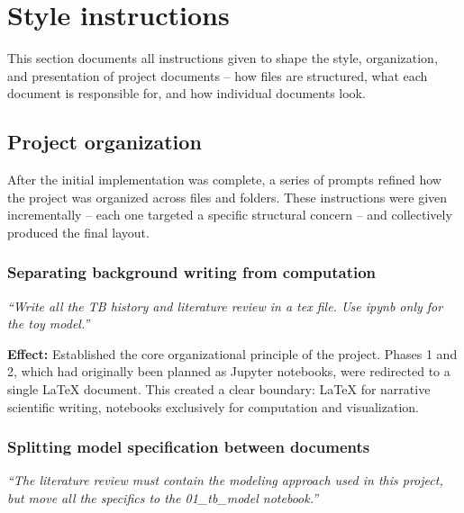 \documentclass[11pt]{article}
\begin{document}
\section{Style instructions}

This section documents all instructions given to shape the style, organization, and presentation of project documents -- how files are structured, what each document is responsible for, and how individual documents look.

\subsection{Project organization}
\label{sec:organization}

After the initial implementation was complete, a series of prompts refined how the project was organized across files and folders. These instructions were given incrementally -- each one targeted a specific structural concern -- and collectively produced the final layout.

\subsubsection{Separating background writing from computation}

\begin{promptbox}
\textit{``Write all the TB history and literature review in a tex file. Use ipynb only for the toy model.''}
\end{promptbox}

\noindent \textbf{Effect:} Established the core organizational principle of the project. Phases 1 and 2, which had originally been planned as Jupyter notebooks, were redirected to a single LaTeX document. This created a clear boundary: \LaTeX{} for narrative scientific writing, notebooks exclusively for computation and visualization.

\subsubsection{Splitting model specification between documents}

\begin{promptbox}
\textit{``The literature review must contain the modeling approach used in this project, but move all the specifics to the 01\_tb\_model notebook.''}
\end{promptbox}
\end{document}
